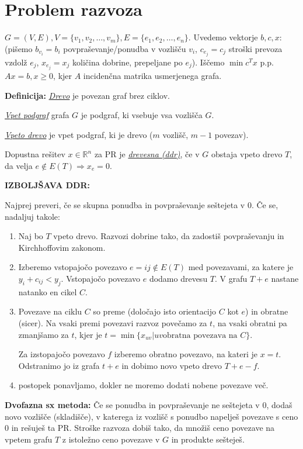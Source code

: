 \documentclass[8pt,a4paper]{amsart}
\theoremstyle{definition} %
\theoremstyle{plain} %
\newcommand{\R}{\mathbb R}
\begin{document}
\thispagestyle{empty}
\section{Problem razvoza}
\thispagestyle{empty}
$G = (V,E), V = \{ v_1,v_2,\ldots ,v_m\} ,E = \{e_1,e_2,\ldots ,e_n \}$.
Uvedemo vektorje $b,c,x$: (pišemo $b_{v_i}=b_i$ povpraševanje/ponudba v vozlišču $v_i$, $c_{e_j}=c_j$ stroški prevoza vzdolž $e_j$, $x_{e_j}=x_j$ količina dobrine, prepeljane po $e_j$).
Iščemo
$\min c^Tx$ p.p. $Ax=b, x\geq 0$, kjer $A$ incidenčna matrika usmerjenega grafa.


\noindent \textbf{Definicija:} \emph{\underline{Drevo}} je povezan graf brez ciklov.

\emph{\underline{Vpet podgraf}} grafa $G$ je podgraf, ki vsebuje vsa vozlišča $G$.

\emph{\underline{Vpeto drevo}} je vpet podgraf, ki je drevo ($m$ vozlišč, $m-1$ povezav).

Dopustna rešitev $x\in \R^n$ za PR je \emph{\underline{drevesna (ddr)}}, če v $G$ obstaja vpeto drevo $T$, da velja $e \notin E(T) \Longrightarrow x_e = 0.$

\textbf{IZBOLJŠAVA DDR:}

Najprej preveri, če se skupna ponudba in povpraševanje seštejeta v 0. Če se, nadaljuj takole:
\begin{enumerate}[1.]
\item Naj bo $T$ vpeto drevo. Razvozi dobrine tako, da zadostiš povpraševanju in Kirchhoffovim zakonom.
\item Izberemo vstopajočo povezavo $e=ij \notin E(T)$ med povezavami, za katere je $y_i + c_{ij} < y_j$. Vstopajočo povezavo $e$ dodamo drevesu $T$. V grafu $T+e$ nastane natanko en cikel $C$.
\item Povezave na ciklu $C$ so preme (določajo isto orientacijo $C$ kot $e$) in obratne (sicer). Na vsaki premi povezavi razvoz povečamo za $t$, na vsaki obratni pa zmanjšamo za $t$, kjer je $t = \min \{x_{uv} | uv \text{obratna povezava na } C \}$.

Za izstopajočo povezavo $f$ izberemo obratno povezavo, na kateri je $x=t$. Odstranimo jo iz grafa $t+e$ in dobimo novo vpeto drevo $T+e-f$.
\item postopek ponavljamo, dokler ne moremo dodati nobene povezave več.
\end{enumerate}

\textbf{Dvofazna sx metoda:} Če se ponudba in povpraševanje ne seštejeta v 0, dodaš novo vozlišče (skladišče), v katerega iz vozlišč s ponudbo napelješ povezave s ceno 0 in rešuješ ta PR.
Stroške razvoza dobiš tako, da množiš ceno povezave na vpetem grafu $T$ z istoležno ceno povezave v $G$ in produkte sešteješ.
\end{document}
